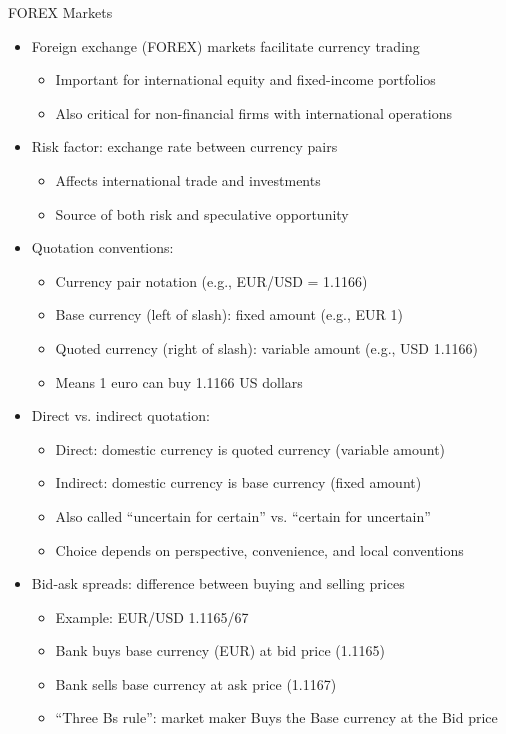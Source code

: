 \documentclass[10pt]{beamer}
\begin{document}
\begin{frame}{FOREX Markets}
  \begin{itemize}[<+->]
    \item Foreign exchange (FOREX) markets facilitate currency trading
      \begin{itemize}
        \item Important for international equity and fixed-income portfolios
        \item Also critical for non-financial firms with international operations
      \end{itemize}
    \item Risk factor: exchange rate between currency pairs
      \begin{itemize}
        \item Affects international trade and investments
        \item Source of both risk and speculative opportunity
      \end{itemize}
    \item Quotation conventions:
      \begin{itemize}
        \item Currency pair notation (e.g., EUR/USD = 1.1166)
        \item Base currency (left of slash): fixed amount (e.g., EUR 1)
        \item Quoted currency (right of slash): variable amount (e.g., USD 1.1166)
        \item Means 1 euro can buy 1.1166 US dollars
      \end{itemize}
    \item Direct vs. indirect quotation:
      \begin{itemize}
        \item Direct: domestic currency is quoted currency (variable amount)
        \item Indirect: domestic currency is base currency (fixed amount)
        \item Also called ``uncertain for certain'' vs. ``certain for uncertain''
        \item Choice depends on perspective, convenience, and local conventions
      \end{itemize}
    \item Bid-ask spreads: difference between buying and selling prices
      \begin{itemize}
        \item Example: EUR/USD 1.1165/67
        \item Bank buys base currency (EUR) at bid price (1.1165)
        \item Bank sells base currency at ask price (1.1167)
        \item ``Three Bs rule'': market maker Buys the Base currency at the Bid price
      \end{itemize}
  \end{itemize}
\end{frame}
\end{document}
